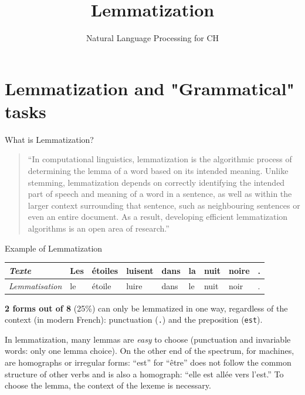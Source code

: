 \documentclass[aspectratio=169]{beamer}
\title[NLP 4 CH]{Lemmatization }
\date[2024] %
{Natural Language Processing for CH}
\begin{document}
\frame{
\maketitle
}

\section{Lemmatization and "Grammatical" tasks}


\begin{frame}{What is Lemmatization?}

\begin{quote}
``In computational linguistics, lemmatization is the algorithmic process of determining the lemma of a word based on its intended meaning. Unlike stemming, lemmatization depends on correctly identifying the intended part of speech and meaning of a word in a sentence, as well as within the larger context surrounding that sentence, such as neighbouring sentences or even an entire document. As a result, developing efficient lemmatization algorithms is an open area of research.''
\end{quote}
\end{frame}

\begin{frame}{Example of Lemmatization}
\begin{center}%
\begin{tabular}{l|llllllll}
\textit{Texte}         & Les & étoiles & luisent & dans & la & nuit & noire & . \\ \hline
\textit{Lemmatisation} & le  & étoile  & luire   & dans & le & nuit & noir  & .
\end{tabular}
\end{center}

\pause

\textbf{2 forms out of 8} (25\%) can only be lemmatized in one way, regardless of the context (in modern French): punctuation (\texttt{.}) and the preposition (\texttt{est}).

\pause
\vspace{1em}

In lemmatization, many lemmas are \textit{easy} to choose (punctuation and invariable words: only one lemma choice). On the other end of the spectrum, for machines, are homographs or irregular forms: “est” for “être” does not follow the common structure of other verbs and is also a homograph: “elle est allée vers l'est.” To choose the lemma, the context of the lexeme is necessary.
\end{frame}
\end{document}
